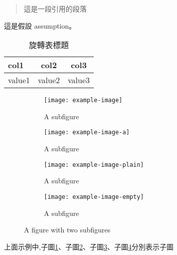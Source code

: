 \documentclass[writingLanguage=chinese,
    addPageTitle=on,
    addDeclaration=on,
    addMUSTlog=off,
    addFigTOC=on,   
    addTabTOC=on,
    refIndent=on,
    printMod=off,
]{.def/must}
\begin{document}
 \begin{quote}
     這是一段引用的段落
 \end{quote}

\begin{assumption}
這是假設 assumption。
\end{assumption}



\begin{sidewaystable}[!htp]
    \setlength{\tabcolsep}{10mm}
    \centering
    \caption{旋轉表標題}
    \begin{tabular}[l]{lcc}
    \toprule
        col1 & col2 & col3 \\
    \midrule
        value1 & value2 & value3 \\
    \bottomrule
    \end{tabular}
\end{sidewaystable}


\begin{figure}[H]
	\centering
	\begin{subfigure}{0.49\textwidth}
	  	\centering
            \texttt{[image: example-image]}
		\caption{A subfigure}
		\label{fig:sub1}
	\end{subfigure}
	\hfill
	\begin{subfigure}{.49\textwidth}
		\centering
            \texttt{[image: example-image-a]}
		\caption{A subfigure}
	  	\label{fig:sub2}
	\end{subfigure}
        \newline
	\begin{subfigure}{.49\textwidth}
		\centering
            \texttt{[image: example-image-plain]}
		\caption{A subfigure}
		\label{fig:sub3}
	\end{subfigure}
	\begin{subfigure}{.49\textwidth}
		\centering
            \texttt{[image: example-image-empty]}
		\caption{A subfigure}
		\label{fig:sub4}
	\end{subfigure}
	\caption{A figure with two subfigures}
	\label{fig:sub}
\end{figure}
上面示例中,子圖\ref{fig:sub1}、子圖\ref{fig:sub2}、子圖\ref{fig:sub3}、子圖\ref{fig:sub4}分別表示子圖
\end{document}
